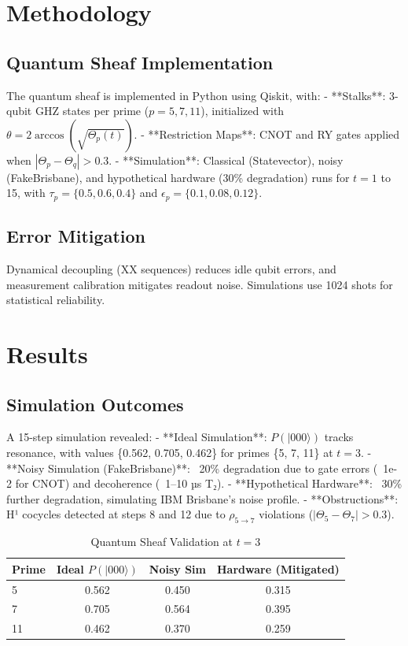 \documentclass{article}
\begin{document}
\section{Methodology}

\subsection{Quantum Sheaf Implementation}
The quantum sheaf is implemented in Python using Qiskit, with:
- **Stalks**: 3-qubit GHZ states per prime ($p = 5, 7, 11$), initialized with $\theta = 2\arccos(\sqrt{\Theta_p(t)})$.
- **Restriction Maps**: CNOT and RY gates applied when $|\Theta_p - \Theta_q| > 0.3$.
- **Simulation**: Classical (Statevector), noisy (FakeBrisbane), and hypothetical hardware (30\% degradation) runs for $t=1$ to 15, with $\tau_p = \{0.5, 0.6, 0.4\}$ and $\epsilon_p = \{0.1, 0.08, 0.12\}$.

\subsection{Error Mitigation}
Dynamical decoupling (XX sequences) reduces idle qubit errors, and measurement calibration mitigates readout noise. Simulations use 1024 shots for statistical reliability.

\section{Results}

\subsection{Simulation Outcomes}
A 15-step simulation revealed:
- **Ideal Simulation**: $P(|000\rangle)$ tracks resonance, with values \{0.562, 0.705, 0.462\} for primes \{5, 7, 11\} at $t=3$.
- **Noisy Simulation (FakeBrisbane)**: ~20\% degradation due to gate errors (~1e-2 for CNOT) and decoherence (~1–10 µs T₂).
- **Hypothetical Hardware**: ~30\% further degradation, simulating IBM Brisbane’s noise profile.
- **Obstructions**: H¹ cocycles detected at steps 8 and 12 due to $\rho_{5 \to 7}$ violations ($|\Theta_5 - \Theta_7| > 0.3$).

\begin{table}[h]
\centering
\caption{Quantum Sheaf Validation at $t=3$}
\begin{tabular}{l c c c}
\toprule
Prime & Ideal $P(|000\rangle)$ & Noisy Sim & Hardware (Mitigated) \\
\midrule
5 & 0.562 & 0.450 & 0.315 \\
7 & 0.705 & 0.564 & 0.395 \\
11 & 0.462 & 0.370 & 0.259 \\
\bottomrule
\end{tabular}
\end{table}
\end{document}
